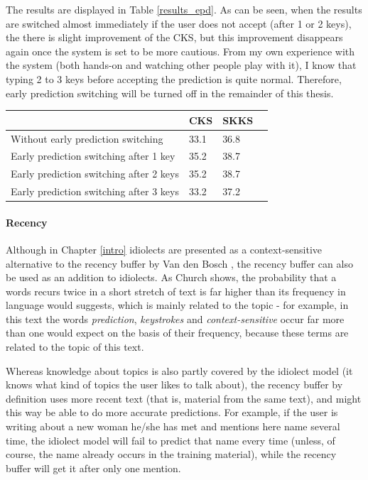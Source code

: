\documentclass[11pt]{article}
\let\originaltable\table
\let\endoriginaltable\endtable
\renewenvironment{table}[1][ht]{%
  \originaltable[#1]
  \centering}%
  {\endoriginaltable}
\begin{document}
The results are displayed in Table \ref{results_epd}. As can be seen, when the results are switched almost immediately if the user does not accept (after 1 or 2 keys), the there is slight improvement of the CKS, but this improvement disappears again once the system is set to be more cautious. From my own experience with the system (both hands-on and watching other people play with it), I know that typing 2 to 3 keys before accepting the prediction is quite normal. Therefore, early prediction switching will be turned off in the remainder of this thesis.

\begin{table}[h]
\begin{tabular}{l|lll} 

&CKS&SKKS\\
\hline
Without early prediction switching&33.1&36.8\\
Early prediction switching after 1 key&35.2&38.7\\
Early prediction switching after 2 keys&35.2&38.7\\
Early prediction switching after 3 keys&33.2&37.2\\
\end{tabular} 
\caption{Percentage of keystrokes saved with and without early prediction switching.} \label{results_epd}
\end{table}

\paragraph{Recency} \label{rb}

Although in Chapter \ref{intro} idiolects are presented as a context-sensitive alternative to the recency buffer by Van den Bosch , the recency buffer can also be used as an addition to idiolects. As Church  shows, the probability that a words recurs twice in a short stretch of text is far higher than its  frequency in language would suggests, which is mainly related to the topic - for example, in this text the words \emph{prediction}, \emph{keystrokes} and \emph{context-sensitive}  occur far more than one would expect on the basis of their frequency, because these terms are related to the topic of this text. 

Whereas knowledge about topics is also partly covered by the idiolect model (it knows what kind of topics the user likes to talk about), the recency buffer by definition uses more recent text (that is, material from the same text), and might this way be able to do more accurate predictions. For example, if the user is writing about a new woman he/she has met and mentions here name several time, the idiolect model will fail to predict that name every time (unless, of course, the name already occurs in the training material), while the recency buffer will get it after only one mention.
\end{document}
